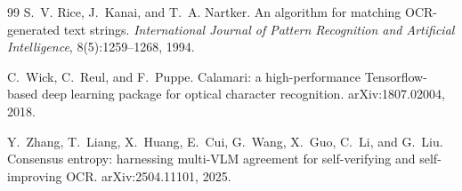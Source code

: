 \documentclass[11pt,a4paper]{article}
\begin{document}
\begin{thebibliography}{99}
 S.~V. Rice, J.~Kanai, and T.~A. Nartker. An algorithm for matching
OCR-generated text strings. \emph{International Journal of Pattern Recognition and
Artificial Intelligence}, 8(5):1259--1268, 1994.

 C.~Wick, C.~Reul, and F.~Puppe. Calamari: a high-performance
Tensorflow-based deep learning package for optical character recognition.
arXiv:1807.02004, 2018.

 Y.~Zhang, T.~Liang, X.~Huang, E.~Cui, G.~Wang, X.~Guo,
C.~Li, and G.~Liu. Consensus entropy: harnessing multi-VLM agreement for self-verifying
and self-improving OCR. arXiv:2504.11101, 2025.

\end{thebibliography}
\end{document}
